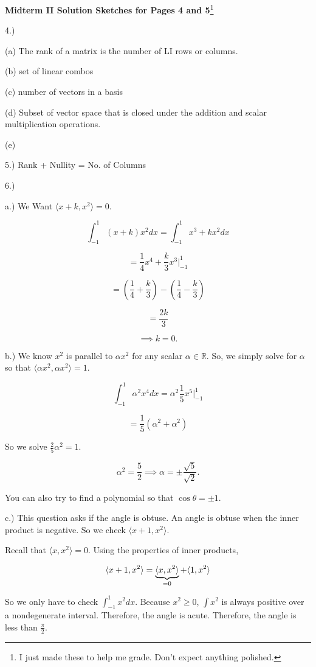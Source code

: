 \documentclass{article}
\begin{document}
\begin{center}
\textbf{Midterm II Solution Sketches for Pages 4 and 5}\footnote{I just made these to help me grade. Don't expect anything polished.}
\end{center}

4.) 

(a) The rank of a matrix is the number of LI rows or columns. 

(b) set of linear combos

(c) number of vectors in a basis

(d) Subset of vector space that is closed under the addition and scalar multiplication operations. 


(e) 


5.) Rank + Nullity = No. of Columns

6.) 

a.) We Want $\langle x+k, x^2\rangle=0$.

$$\int_{-1}^1 (x+k)x^2dx = \int_{-1}^1 x^3+kx^2dx$$

$$=\frac{1}{4}x^4 + \frac{k}{3}x^3\bigg\rvert_{-1}^1$$

$$=(\frac{1}{4}+\frac{k}{3})-(\frac{1}{4}-\frac{k}{3})$$

$$=\frac{2k}{3}$$

$$\implies k=0.$$


b.) We know $x^2$ is parallel to $\alpha x^2$ for any scalar $\alpha\in\mathbb{R}$. So, we simply solve for $\alpha$ so that $\langle \alpha x^2, \alpha x^2 \rangle =1$.

$$\int_{-1}^{1} \alpha^2 x^4 dx = \alpha^2 \frac{1}{5}x^5\bigg\rvert_{-1}^1$$

$$=\frac{1}{5}(\alpha^2 +\alpha^2)$$

So we solve $\frac{2}{5}\alpha^2 = 1$. 

$$\alpha^2 = \frac{5}{2} \implies \alpha = \pm \frac{\sqrt{5}}{\sqrt{2}}.$$

You can also try to find a polynomial so that $\cos \theta = \pm 1$. 


c.) This question asks if the angle is obtuse. An angle is obtuse when the inner product is negative. So we check $\langle x+1, x^2 \rangle$. 

Recall that $\langle x, x^2 \rangle=0$. Using the properties of inner products,

$$\langle x+1, x^2 \rangle = \underbrace{\langle x, x^2 \rangle}_{\mathclap{=0}} + \langle 1, x^2 \rangle$$

So we only have to check $\int_{-1}^1 x^2 dx$. Because $x^2\geq 0$, $\int x^2$ is always positive over a nondegenerate interval. Therefore, the angle is acute. Therefore, the angle is less than $\frac{\pi}{2}$. 
\end{document}
